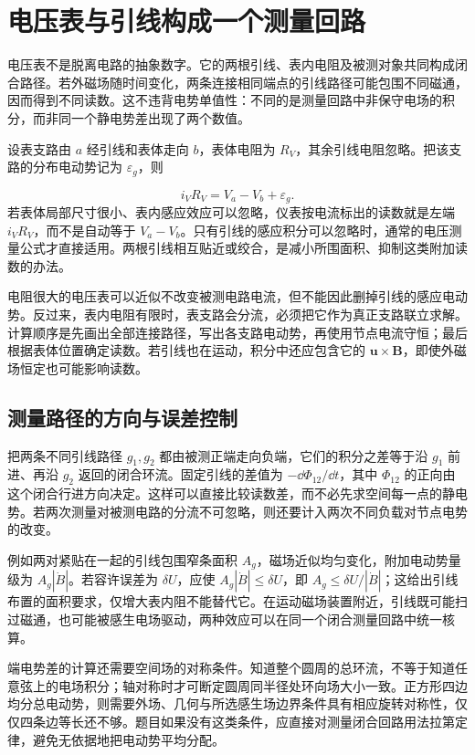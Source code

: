 \section{电压表与引线构成一个测量回路}

电压表不是脱离电路的抽象数字。它的两根引线、表内电阻及被测对象共同构成闭合路径。若外磁场随时间变化，两条连接相同端点的引线路径可能包围不同磁通，因而得到不同读数。这不违背电势单值性：不同的是测量回路中非保守电场的积分，而非同一个静电势差出现了两个数值。




设表支路由 $a$ 经引线和表体走向 $b$，表体电阻为 $R_V$，其余引线电阻忽略。把该支路的分布电动势记为 $\varepsilon_g$，则

\[i_VR_V=V_a-V_b+\varepsilon_g.\]
若表体局部尺寸很小、表内感应效应可以忽略，仪表按电流标出的读数就是左端 $i_VR_V$，而不是自动等于 $V_a-V_b$。只有引线的感应积分可以忽略时，通常的电压测量公式才直接适用。两根引线相互贴近或绞合，是减小所围面积、抑制这类附加读数的办法。


电阻很大的电压表可以近似不改变被测电路电流，但不能因此删掉引线的感应电动势。反过来，表内电阻有限时，表支路会分流，必须把它作为真正支路联立求解。计算顺序是先画出全部连接路径，写出各支路电动势，再使用节点电流守恒；最后根据表体位置确定读数。若引线也在运动，积分中还应包含它的 $\bm u\times\bm B$，即使外磁场恒定也可能影响读数。



\subsection{测量路径的方向与误差控制}

把两条不同引线路径 $g_1,g_2$ 都由被测正端走向负端，它们的积分之差等于沿 $g_1$ 前进、再沿 $g_2$ 返回的闭合环流。固定引线的差值为 $-\dd\Phi_{12}/\dd t$，其中 $\Phi_{12}$ 的正向由这个闭合行进方向决定。这样可以直接比较读数差，而不必先求空间每一点的静电势。若两次测量对被测电路的分流不可忽略，则还要计入两次不同负载对节点电势的改变。


例如两对紧贴在一起的引线包围窄条面积 $A_g$，磁场近似均匀变化，附加电动势量级为 $A_g|\dot B|$。若容许误差为 $\delta U$，应使 $A_g|\dot B|\le\delta U$，即 $A_g\le\delta U/|\dot B|$；这给出引线布置的面积要求，仅增大表内阻不能替代它。在运动磁场装置附近，引线既可能扫过磁通，也可能被感生电场驱动，两种效应可以在同一个闭合测量回路中统一核算。


端电势差的计算还需要空间场的对称条件。知道整个圆周的总环流，不等于知道任意弦上的电场积分；轴对称时才可断定圆周同半径处环向场大小一致。正方形四边均分总电动势，则需要外场、几何与所选感生场边界条件具有相应旋转对称性，仅仅四条边等长还不够。题目如果没有这类条件，应直接对测量闭合回路用法拉第定律，避免无依据地把电动势平均分配。


